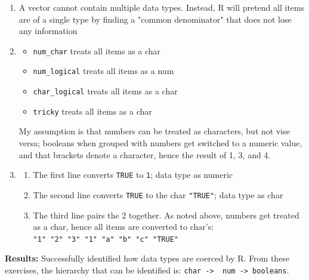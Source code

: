 \documentclass{article}
\begin{document}
\begin{enumerate}
    \item A vector cannot contain multiple data types. Instead, R will pretend all items are of a single type by finding a "common denominator" that does not lose any information
    \item
    \begin{itemize}
        \item \verb|num_char| treats all items as a char
        \item \verb|num_logical| treats all items as a num
        \item \verb|char_logical| treats all items as a char
        \item \verb|tricky| treats all items as a char
    \end{itemize}
    My assumption is that numbers can be treated as characters, but not vise versa; booleans when grouped with numbers get switched to a numeric value, and that brackets denote a character, hence the result of 1, 3, and 4.
    \item
    \begin{enumerate}
        \item The first line converts \verb|TRUE| to \verb|1|; data type as numeric
        \item The second line converts \verb|TRUE| to the char \verb|"TRUE"|; data type as char
        \item The third line pairs the 2 together. As noted above, numbers get treated as a char, hence all items are converted to char's:\\
        \verb|"1" "2" "3" "1" "a" "b" "c" "TRUE"|
    \end{enumerate}
\end{enumerate}
\textbf{Results:} Successfully identified how data types are coerced by R. From these exercises, the hierarchy that can be identified is:
\verb|char ->  num -> booleans|.

\end{document}
